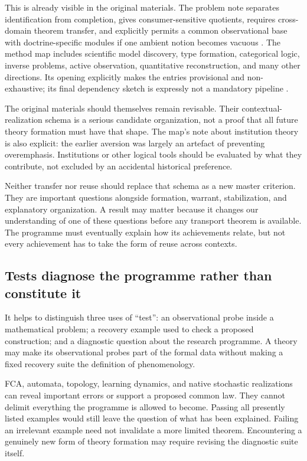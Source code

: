 \documentclass[11pt]{article}
\begin{document}
This is already visible in the original materials. The problem note separates identification from completion, gives consumer-sensitive quotients, requires cross-domain theorem transfer, and explicitly permits a common observational base with doctrine-specific modules if one ambient notion becomes vacuous \cite[sections on success conditions, transport, and the proposed main conjecture]{ProblemNote}. The method map includes scientific model discovery, type formation, categorical logic, inverse problems, active observation, quantitative reconstruction, and many other directions. Its opening explicitly makes the entries provisional and non-exhaustive; its final dependency sketch is expressly not a mandatory pipeline \cite{Map}.

The original materials should themselves remain revisable. Their contextual-realization schema is a serious candidate organization, not a proof that all future theory formation must have that shape. The map's note about institution theory is also explicit: the earlier aversion was largely an artefact of preventing overemphasis. Institutions or other logical tools should be evaluated by what they contribute, not excluded by an accidental historical preference.

Neither transfer nor reuse should replace that schema as a new master criterion. They are important questions alongside formation, warrant, stabilization, and explanatory organization. A result may matter because it changes our understanding of one of these questions before any transport theorem is available. The programme must eventually explain how its achievements relate, but not every achievement has to take the form of reuse across contexts.

\subsection{Tests diagnose the programme rather than constitute it}
\label{sec:diagnostics}

It helps to distinguish three uses of ``test'': an observational probe inside a mathematical problem; a recovery example used to check a proposed construction; and a diagnostic question about the research programme. A theory may make its observational probes part of the formal data without making a fixed recovery suite the definition of phenomenology.

FCA, automata, topology, learning dynamics, and native stochastic realizations can reveal important errors or support a proposed common law. They cannot delimit everything the programme is allowed to become. Passing all presently listed examples would still leave the question of what has been explained. Failing an irrelevant example need not invalidate a more limited theorem. Encountering a genuinely new form of theory formation may require revising the diagnostic suite itself.
\end{document}
